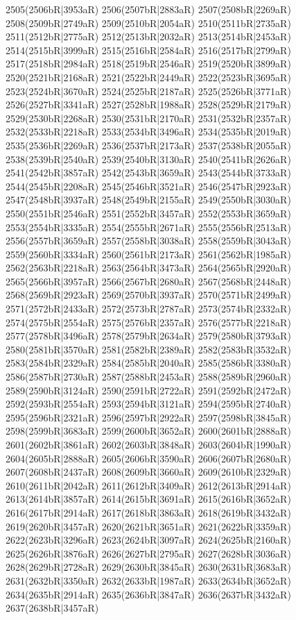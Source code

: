 2505(2506bR|3953aR) 2506(2507bR|2883aR) 2507(2508bR|2269aR) 2508(2509bR|2749aR) 2509(2510bR|2054aR) 2510(2511bR|2735aR) \\2511(2512bR|2775aR) 2512(2513bR|2032aR) 2513(2514bR|2453aR) 2514(2515bR|3999aR) 2515(2516bR|2584aR) 2516(2517bR|2799aR) 2517(2518bR|2984aR) 2518(2519bR|2546aR) 2519(2520bR|3899aR) \\2520(2521bR|2168aR) 2521(2522bR|2449aR) 2522(2523bR|3695aR) 2523(2524bR|3670aR) 2524(2525bR|2187aR) 2525(2526bR|3771aR) 2526(2527bR|3341aR) 2527(2528bR|1988aR) 2528(2529bR|2179aR) \\2529(2530bR|2268aR) 2530(2531bR|2170aR) 2531(2532bR|2357aR) 2532(2533bR|2218aR) 2533(2534bR|3496aR) 2534(2535bR|2019aR) 2535(2536bR|2269aR) 2536(2537bR|2173aR) 2537(2538bR|2055aR) \\2538(2539bR|2540aR) 2539(2540bR|3130aR) 2540(2541bR|2626aR) 2541(2542bR|3857aR) 2542(2543bR|3659aR) 2543(2544bR|3733aR) 2544(2545bR|2208aR) 2545(2546bR|3521aR) 2546(2547bR|2923aR) \\2547(2548bR|3937aR) 2548(2549bR|2155aR) 2549(2550bR|3030aR) 2550(2551bR|2546aR) 2551(2552bR|3457aR) 2552(2553bR|3659aR) 2553(2554bR|3335aR) 2554(2555bR|2671aR) 2555(2556bR|2513aR) \\2556(2557bR|3659aR) 2557(2558bR|3038aR) 2558(2559bR|3043aR) 2559(2560bR|3334aR) 2560(2561bR|2173aR) 2561(2562bR|1985aR) 2562(2563bR|2218aR) 2563(2564bR|3473aR) 2564(2565bR|2920aR) \\2565(2566bR|3957aR) 2566(2567bR|2680aR) 2567(2568bR|2448aR) 2568(2569bR|2923aR) 2569(2570bR|3937aR) 2570(2571bR|2499aR) 2571(2572bR|2433aR) 2572(2573bR|2787aR) 2573(2574bR|2332aR) \\2574(2575bR|2554aR) 2575(2576bR|2357aR) 2576(2577bR|2218aR) 2577(2578bR|3496aR) 2578(2579bR|2634aR) 2579(2580bR|3793aR) 2580(2581bR|3570aR) 2581(2582bR|2389aR) 2582(2583bR|3532aR) \\2583(2584bR|2329aR) 2584(2585bR|2040aR) 2585(2586bR|3380aR) 2586(2587bR|2730aR) 2587(2588bR|2453aR) 2588(2589bR|2960aR) 2589(2590bR|3124aR) 2590(2591bR|2722aR) 2591(2592bR|2472aR) \\2592(2593bR|2554aR) 2593(2594bR|3121aR) 2594(2595bR|2740aR) 2595(2596bR|2321aR) 2596(2597bR|2922aR) 2597(2598bR|3845aR) 2598(2599bR|3683aR) 2599(2600bR|3652aR) 2600(2601bR|2888aR) \\2601(2602bR|3861aR) 2602(2603bR|3848aR) 2603(2604bR|1990aR) 2604(2605bR|2888aR) 2605(2606bR|3590aR) 2606(2607bR|2680aR) 2607(2608bR|2437aR) 2608(2609bR|3660aR) 2609(2610bR|2329aR) \\2610(2611bR|2042aR) 2611(2612bR|3409aR) 2612(2613bR|2914aR) 2613(2614bR|3857aR) 2614(2615bR|3691aR) 2615(2616bR|3652aR) 2616(2617bR|2914aR) 2617(2618bR|3863aR) 2618(2619bR|3432aR) \\2619(2620bR|3457aR) 2620(2621bR|3651aR) 2621(2622bR|3359aR) 2622(2623bR|3296aR) 2623(2624bR|3097aR) 2624(2625bR|2160aR) 2625(2626bR|3876aR) 2626(2627bR|2795aR) 2627(2628bR|3036aR) \\2628(2629bR|2728aR) 2629(2630bR|3845aR) 2630(2631bR|3683aR) 2631(2632bR|3350aR) 2632(2633bR|1987aR) 2633(2634bR|3652aR) 2634(2635bR|2914aR) 2635(2636bR|3847aR) 2636(2637bR|3432aR) \\2637(2638bR|3457aR) 